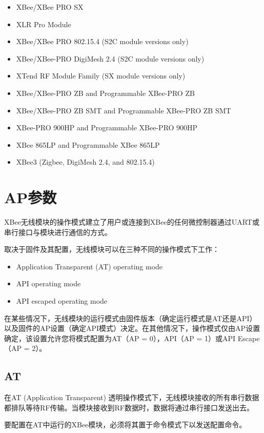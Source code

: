 \begin{itemize}
    \item XBee/XBee PRO SX
    \item XLR Pro Module
    \item XBee/XBee PRO 802.15.4 (S2C module versions only)
    \item XBee/XBee-PRO DigiMesh 2.4 (S2C module versions only)
    \item XTend RF Module Family (SX module versions only)
    \item XBee/XBee-PRO ZB and Programmable XBee-PRO ZB
    \item XBee/XBee-PRO ZB SMT and Programmable XBee-PRO ZB SMT
    \item XBee-PRO 900HP and Programmable XBee-PRO 900HP
    \item XBee 865LP and Programmable XBee 865LP
    \item XBee3 (Zigbee, DigiMesh 2.4, and 802.15.4)
\end{itemize}

\section{AP参数}

XBee无线模块的操作模式建立了用户或连接到XBee的任何微控制器通过UART或串行接口与模块进行通信的方式。

取决于固件及其配置，无线模块可以在三种不同的操作模式下工作：

\begin{itemize}
    \item Application Transparent (AT) operating mode
    \item API operating mode
    \item API escaped operating mode
\end{itemize}

在某些情况下，无线模块的运行模式由固件版本（确定运行模式是AT还是API）以及固件的AP设置（确定API模式）决定。在其他情况下，操作模式仅由AP设置确定，该设置允许您将模式配置为AT（AP = 0），API（AP = 1）或API Escape（AP = 2）。

\subsection{AT}

在AT (Application Transparent) 透明操作模式下，无线模块接收的所有串行数据都排队等待RF传输。当模块接收到RF数据时，数据将通过串行接口发送出去。

要配置在AT中运行的XBee模块，必须将其置于命令模式下以发送配置命令。

